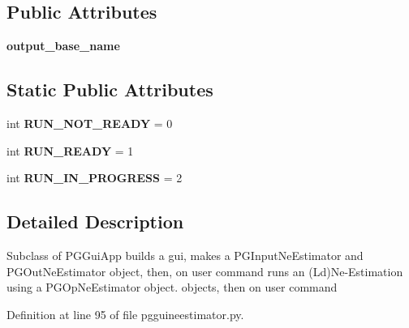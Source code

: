 \subsection*{Public Attributes}
\begin{DoxyCompactItemize}
\item 
{\bfseries output\+\_\+base\+\_\+name}\hypertarget{classnegui_1_1pgguineestimator_1_1PGGuiNeEstimator_a06cd70f99cee79ebf3a4efb9a17880e9}{}\label{classnegui_1_1pgguineestimator_1_1PGGuiNeEstimator_a06cd70f99cee79ebf3a4efb9a17880e9}

\end{DoxyCompactItemize}
\subsection*{Static Public Attributes}
\begin{DoxyCompactItemize}
\item 
int {\bfseries R\+U\+N\+\_\+\+N\+O\+T\+\_\+\+R\+E\+A\+DY} = 0\hypertarget{classnegui_1_1pgguineestimator_1_1PGGuiNeEstimator_afa88b13381c75387e9aaf718ce34f347}{}\label{classnegui_1_1pgguineestimator_1_1PGGuiNeEstimator_afa88b13381c75387e9aaf718ce34f347}

\item 
int {\bfseries R\+U\+N\+\_\+\+R\+E\+A\+DY} = 1\hypertarget{classnegui_1_1pgguineestimator_1_1PGGuiNeEstimator_a1b3261b5f26e2451eff21cd8349c13f0}{}\label{classnegui_1_1pgguineestimator_1_1PGGuiNeEstimator_a1b3261b5f26e2451eff21cd8349c13f0}

\item 
int {\bfseries R\+U\+N\+\_\+\+I\+N\+\_\+\+P\+R\+O\+G\+R\+E\+SS} = 2\hypertarget{classnegui_1_1pgguineestimator_1_1PGGuiNeEstimator_a417eb80b718ee94f92e578e92da9c9f3}{}\label{classnegui_1_1pgguineestimator_1_1PGGuiNeEstimator_a417eb80b718ee94f92e578e92da9c9f3}

\end{DoxyCompactItemize}


\subsection{Detailed Description}
\begin{DoxyVerb}Subclass of PGGuiApp builds a gui,
makes a PGInputNeEstimator and PGOutNeEstimator 
object, then, on user command runs an (Ld)Ne-Estimation
using a PGOpNeEstimator object.
objects, then on user command   
\end{DoxyVerb}
 

Definition at line 95 of file pgguineestimator.\+py.



